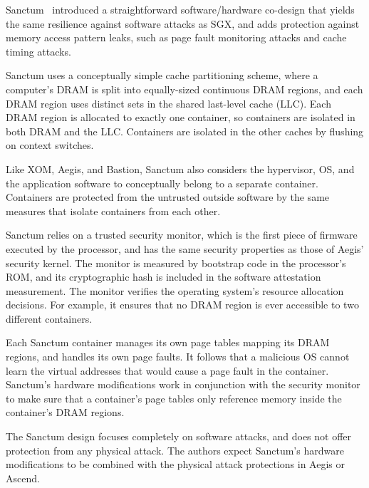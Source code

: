 \label{sec:related_sanctum}

Sanctum~\cite{costan2015sanctum} introduced a straightforward software/hardware
co-design that yields the same resilience against software attacks as SGX, and
adds protection against memory access pattern leaks, such as page fault
monitoring attacks and cache timing attacks.

Sanctum uses a conceptually simple cache partitioning scheme, where a
computer's DRAM is split into equally-sized continuous DRAM regions, and each
DRAM region uses distinct sets in the shared last-level cache (LLC). Each DRAM
region is allocated to exactly one container, so containers are isolated in
both DRAM and the LLC. Containers are isolated in the other caches by flushing
on context switches.

Like XOM, Aegis, and Bastion, Sanctum also considers the hypervisor, OS, and the
application software to conceptually belong to a separate container. Containers
are protected from the untrusted outside software by the same measures that
isolate containers from each other.

Sanctum relies on a trusted security monitor, which is the first piece of
firmware executed by the processor, and has the same security properties as
those of Aegis' security kernel. The monitor is measured by bootstrap code in
the processor's ROM, and its cryptographic hash is included in the software
attestation measurement. The monitor verifies the operating system's resource
allocation decisions. For example, it ensures that no DRAM region is ever
accessible to two different containers.

Each Sanctum container manages its own page tables mapping its DRAM regions,
and handles its own page faults. It follows that a malicious OS cannot learn the
virtual addresses that would cause a page fault in the container. Sanctum's
hardware modifications work in conjunction with the security monitor to make
sure that a container's page tables only reference memory inside the container's
DRAM regions.

The Sanctum design focuses completely on software attacks, and does not offer
protection from any physical attack. The authors expect Sanctum's hardware
modifications to be combined with the physical attack protections in Aegis or
Ascend.
